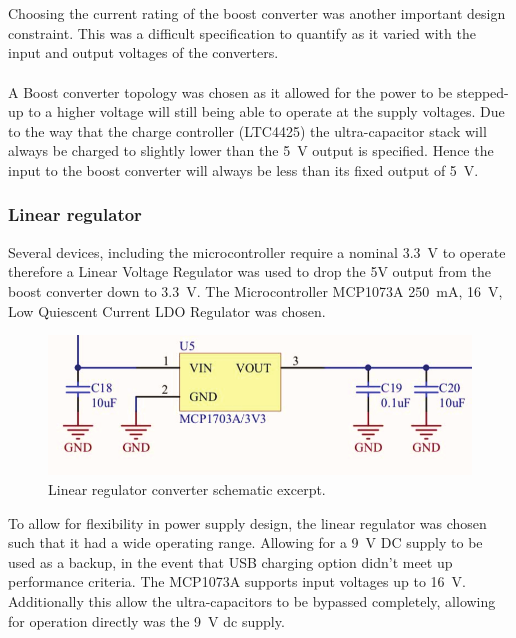 \\ \\
Choosing the current rating of the boost converter was another important design constraint. This was a difficult specification to quantify as it varied with the input and output voltages of the converters.
\\ \\
A Boost converter topology was chosen as it allowed for the power to be stepped-up to a higher voltage will still being able to operate at the supply voltages. Due to the way that the charge controller (LTC4425) the ultra-capacitor stack will always be charged to slightly lower than the \SI{5}{V} output is specified. Hence the input to the boost converter will always be less than its fixed output of \SI{5}{V}.

\subsubsection{Linear regulator}
Several devices, including the microcontroller require a nominal \SI{3.3}{V} to operate therefore a Linear Voltage Regulator was used to drop the 5V output from the boost converter down to \SI{3.3}{V}. The Microcontroller MCP1073A \SI{250}{mA}, \SI{16}{V}, Low Quiescent Current LDO Regulator was chosen.
\begin{figure}[H]
    \centering
    \includegraphics[width = 12cm]{figures/hardware/regulator_schematic.pdf}
    \caption{Linear regulator converter schematic excerpt.}
    \label{fig:regulator}
\end{figure}
To allow for flexibility in power supply design, the linear regulator was chosen such that it had a wide operating range. Allowing for a \SI{9}{V} DC supply to be used as a backup, in the event that USB charging option didn’t meet up performance criteria. The MCP1073A supports input voltages up to \SI{16}{V}. Additionally this allow the ultra-capacitors to be bypassed completely, allowing for operation directly was the \SI{9}{V} dc supply.

